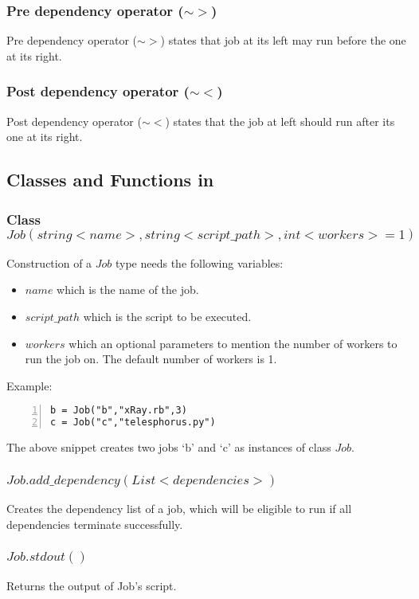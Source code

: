 \subsubsection*{Pre dependency operator ($\sim>$)}
Pre dependency operator ($\sim>$) states that job at its left may run before the one
at its right.
\subsubsection*{Post dependency operator ($\sim<$)}
Post dependency operator ($\sim<$) states that the job at left should run after its one
at its right.

\subsection*{Classes and Functions in \lang{}}
\subsubsection*{Class $Job(string <name>, string <script\_path>, int <workers>=1)$}
Construction of a $Job$ type needs the following variables:
\begin{itemize}
\item $name$ which is the name of the job.
\item $script\_path$ which is the script to be executed.
\item $workers$ which an optional parameters to mention the number of workers to run the job on. The default number of workers is 1.
\end{itemize}
Example:\\
\begin{Verbatim}[numbers=left]
b = Job("b","xRay.rb",3)
c = Job("c","telesphorus.py")
\end{Verbatim}
The above snippet creates two jobs `b' and `c' as instances of class $Job$.
\subsubsection*{$Job.add\_dependency(List <dependencies>)$}
Creates the dependency list of a job, which will be eligible to run if all dependencies terminate successfully.
\subsubsection*{$Job.stdout()$}
Returns the output of Job's script.
